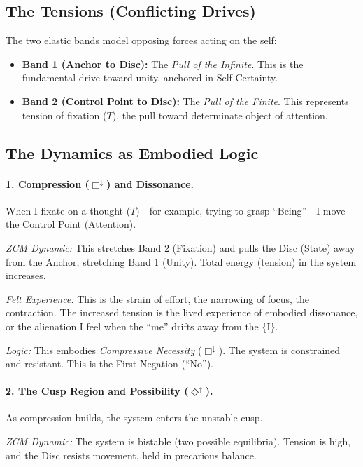 \documentclass[12pt]{book}
\begin{document}
\subsection{The Tensions (Conflicting Drives)}

The two elastic bands model opposing forces acting on the self:

\begin{itemize}
    \item \textbf{Band 1 (Anchor to Disc):} The \textit{Pull of the \textit{In}finite}. This is the fundamental drive toward unity, anchored in Self-Certainty.
    \item \textbf{Band 2 (Control Point to Disc):} The \textit{Pull of the Finite}. This represents tension of fixation ($T$), the pull toward determinate object of attention.
\end{itemize}

\subsection{The Dynamics as Embodied Logic}

\paragraph{1. Compression ($\Box^{\downarrow}$) and Dissonance.}
When I fixate on a thought ($T$)---for example, trying to grasp ``Being''---I move the Control Point (Attention).

\textit{ZCM Dynamic:} This stretches Band 2 (Fixation) and pulls the Disc (State) away from the Anchor, stretching Band 1 (Unity). Total energy (tension) in the system increases.

\textit{Felt Experience:} This is the strain of effort, the narrowing of focus, the contraction. The increased tension is the lived experience of embodied dissonance, or the alienation I feel when the ``me'' drifts away from the \{I\}.

\textit{Logic:} This embodies \textit{Compressive Necessity} ($\Box^{\downarrow}$). The system is constrained and resistant. This is the First Negation (``No'').

\paragraph{2. The Cusp Region and Possibility ($\Diamond^{\uparrow}$).}
As compression builds, the system enters the unstable cusp.

\textit{ZCM Dynamic:} The system is bistable (two possible equilibria). Tension is high, and the Disc resists movement, held in precarious balance.
\end{document}
